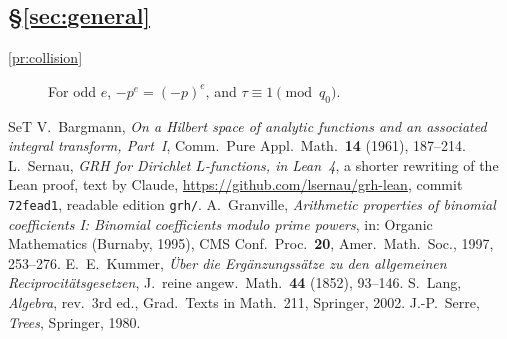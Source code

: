 \documentclass[reqno]{amsart}
\theoremstyle{definition}
\theoremstyle{plain}
\begin{document}
\subsection*{\S\ref{sec:general}}
\begin{description}
\item[\ref{pr:collision}] For odd \(e\), \(-p^e = (-p)^e\), and \(\tau \equiv 1 \pmod{q_0}\).
\end{description}

\begin{thebibliography}{SeT}
 V.~Bargmann, \emph{On a Hilbert space of analytic functions and an associated integral transform, Part~I}, Comm.\ Pure Appl.\ Math.\ \textbf{14} (1961), 187--214.
 L.~Sernau, \emph{GRH for Dirichlet \(L\)-functions, in Lean~4}, a shorter rewriting of the Lean proof, text by Claude, \url{https://github.com/lsernau/grh-lean}, commit \texttt{72fead1}, readable edition \texttt{grh/}.
 A.~Granville, \emph{Arithmetic properties of binomial coefficients I: Binomial coefficients modulo prime powers}, in: Organic Mathematics (Burnaby, 1995), CMS Conf.\ Proc.\ \textbf{20}, Amer.\ Math.\ Soc., 1997, 253--276.
 E.~E.~Kummer, \emph{\"Uber die Erg\"anzungss\"atze zu den allgemeinen Reciprocit\"atsgesetzen}, J.\ reine angew.\ Math.\ \textbf{44} (1852), 93--146.
 S.~Lang, \emph{Algebra}, rev.\ 3rd ed., Grad.\ Texts in Math.\ 211, Springer, 2002.
 J.-P.~Serre, \emph{Trees}, Springer, 1980.
\end{thebibliography}
\end{document}
